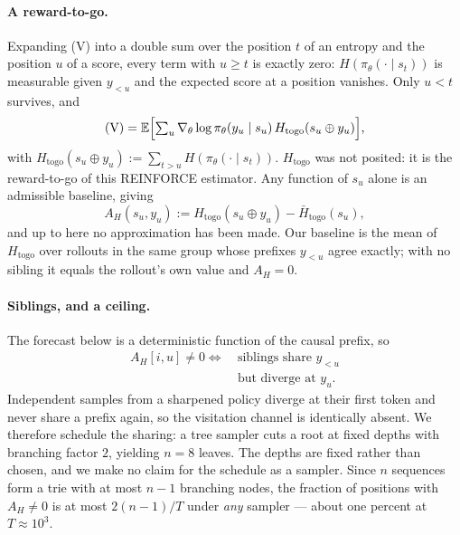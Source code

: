 \documentclass[11pt]{article}
\newcommand{\Htogo}{H_{\mathrm{togo}}}
\newcommand{\AH}{A_{H}}
\newcommand{\E}{\mathbb{E}}
\newcommand{\gradt}{\nabla_{\theta}}
\newcommand{\pit}{\pi_{\theta}}
\begin{document}
\paragraph{A reward-to-go.} Expanding (V) into a double sum over the position $t$ of
an entropy and the position $u$ of a score, every term with $u \ge t$ is exactly zero:
$H(\pit(\cdot\mid s_t))$ is measurable given $y_{<u}$ and the expected score at a
position vanishes. Only $u < t$ survives, and
\begin{equation}
(\mathrm{V}) = \E\Bigl[\textstyle\sum_u \gradt \log \pit(y_u \mid s_u)\,
\Htogo(s_u \oplus y_u)\Bigr],
\label{eq:togo}
\end{equation}
with $\Htogo(s_u \oplus y_u) := \sum_{t > u} H(\pit(\cdot \mid s_t))$. $\Htogo$ was
not posited: it is the reward-to-go of this REINFORCE estimator. Any function of
$s_u$ alone is an admissible baseline, giving
\begin{equation}
\AH(s_u, y_u) := \Htogo(s_u \oplus y_u) - \bar{H}_{\mathrm{togo}}(s_u),
\label{eq:ah}
\end{equation}
and up to here no approximation has been made. Our baseline is the mean of $\Htogo$
over rollouts in the same group whose prefixes $y_{<u}$ agree exactly; with no
sibling it equals the rollout's own value and $\AH = 0$.

\paragraph{Siblings, and a ceiling.} The forecast below is a deterministic function
of the causal prefix, so
\begin{equation}
\begin{split}
\AH[i, u] \neq 0 \iff\ &\text{siblings share } y_{<u}\\
&\text{but diverge at } y_u .
\end{split}
\label{eq:branchonly}
\end{equation}
Independent samples from a sharpened policy diverge at their first token and never
share a prefix again, so the visitation channel is identically absent. We therefore
schedule the sharing: a tree sampler cuts a root at fixed depths with branching
factor $2$, yielding $n = 8$ leaves. The depths are fixed rather than chosen, and we
make no claim for the schedule as a sampler. Since $n$ sequences form a trie with at
most $n - 1$ branching nodes, the fraction of positions with $\AH \ne 0$ is at most
$2(n-1)/T$ under \emph{any} sampler --- about one percent at $T \approx 10^3$.
\end{document}
